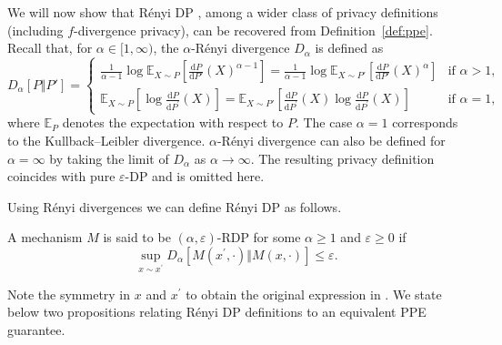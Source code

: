 \documentclass{article}
\theoremstyle{plain}
\theoremstyle{plain}
\theoremstyle{definition}
\theoremstyle{remark}
\theoremstyle{plain}
\newcommand{\rmd}{\mathrm{d}}
\renewcommand{\epsilon}{\varepsilon}
\begin{document}
We will now show that R\'{e}nyi DP \citep{mironov2017renyi}, among a wider class of privacy definitions (including $f$-divergence privacy), can be recovered from Definition~\ref{def:ppe}. Recall that, for $\alpha \in [1, \infty)$, the $\alpha$-R\'{e}nyi divergence $D_\alpha$ is defined as
   \begin{equation} \label{renyi-def}
        D_\alpha[P\Vert P'] = 
        \begin{cases}
        \frac{1}{\alpha-1} \log \mathbb{E}_{X\sim P}\left[\frac{\rmd P}{\rmd P'}(X)^{\alpha-1} \right] = \frac{1}{\alpha-1} \log\mathbb{E}_{X\sim P'}\left[\frac{\rmd P}{\rmd P'}(X)^{\alpha}\right]  & \text{if } \alpha>1, \\
        \mathbb{E}_{X\sim P}\left[\log\frac{\rmd P}{\rmd P^\prime}(X)  \right] = \mathbb{E}_{X \sim P'}\left[\frac{\rmd P}{\rmd P^\prime}(X)\log \frac{\rmd P}{\rmd P^\prime}(X)  \right] & \text{if } \alpha=1,
        \end{cases}
    \end{equation}
where $\mathbb E_{P}$ denotes the expectation with respect to $P$. The case $\alpha = 1$ corresponds to the Kullback–Leibler divergence. $\alpha$-R\'enyi divergence can also be defined for $\alpha = \infty$ by taking the limit of $D_\alpha$ as $\alpha \to \infty$. The resulting privacy definition coincides with pure $\epsilon$-DP and is omitted here. 

Using R\'{e}nyi divergences we can define R\'{e}nyi DP as follows.
\begin{definition}
    A mechanism $M$ is said to be $(\alpha,\epsilon)$-RDP for some $\alpha \geq 1$ and $\epsilon \geq 0$ if
    \begin{equation*}
        \sup_{x\sim x^\prime} D_\alpha[M(x^\prime,\cdot)\Vert M(x,\cdot)] \leq \epsilon.
    \end{equation*}
\end{definition}
Note the symmetry in $x$ and $x^\prime$ to obtain the original expression in \citet{mironov2017renyi}. We state below two propositions relating R\'enyi DP definitions to an equivalent PPE guarantee.
\end{document}
